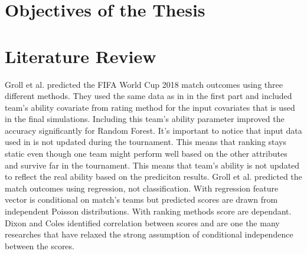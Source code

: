 \section{Objectives of the Thesis}
\section{Literature Review}
Groll et al. \cite{groll2018prediction} predicted the FIFA World Cup 2018 match outcomes using three different methods. They used the same data as in \cite{groll2015prediction} in the first part and included team's ability covariate from rating method for the input covariates that is used in the final simulations. Including this team's ability parameter improved the accuracy significantly for Random Forest. It's important to notice that input data used in \cite{groll2018prediction} is not updated during the tournament. This means that ranking stays static even though one team might perform well based on the other attributes and survive far in the tournament. This means that team's ability is not updated to reflect the real ability based on the prediciton results.
Groll et al. \cite{groll2018prediction} predicted the match outcomes using regression, not classification. With regression feature vector is conditional on match's teams but predicted scores are drawn from independent Poisson distributions. With ranking methods score are dependant. Dixon and Coles \cite{dixon1997} identified correlation between scores and are one the many researches that have relaxed the strong assumption of conditional independence between the scores.

